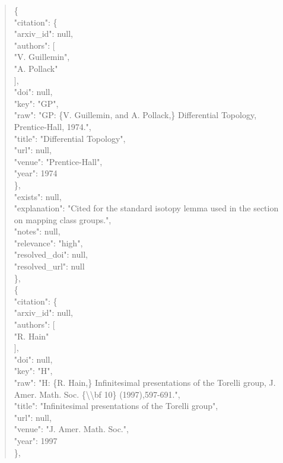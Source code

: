 \documentclass[11pt]{article}
\begin{document}
\begin{quote}
    \{\\
      "citation": \{\\
        "arxiv\_id": null,\\
        "authors": [\\
          "V. Guillemin",\\
          "A. Pollack"\\
        ],\\
        "doi": null,\\
        "key": "GP",\\
        "raw": "GP: \{V. Guillemin, and A. Pollack,\} Differential Topology, Prentice-Hall, 1974.",\\
        "title": "Differential Topology",\\
        "url": null,\\
        "venue": "Prentice-Hall",\\
        "year": 1974\\
      \},\\
      "exists": null,\\
      "explanation": "Cited for the standard isotopy lemma used in the section on mapping class groups.",\\
      "notes": null,\\
      "relevance": "high",\\
      "resolved\_doi": null,\\
      "resolved\_url": null\\
    \},\\
    \{\\
      "citation": \{\\
        "arxiv\_id": null,\\
        "authors": [\\
          "R. Hain"\\
        ],\\
        "doi": null,\\
        "key": "H",\\
        "raw": "H: \{R. Hain,\} Infinitesimal presentations of the Torelli group, J. Amer. Math. Soc. \{\textbackslash{}\textbackslash{}bf 10\} (1997),597-691.",\\
        "title": "Infinitesimal presentations of the Torelli group",\\
        "url": null,\\
        "venue": "J. Amer. Math. Soc.",\\
        "year": 1997\\
      \},\\

\end{quote}
\end{document}
